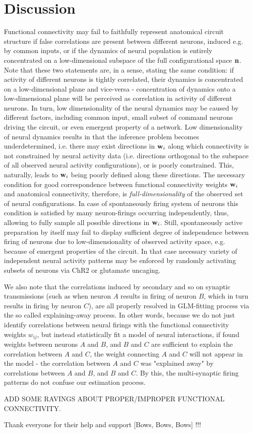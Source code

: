 \documentclass[amsmath,amssymb]{revtex4}
\begin{document}
\section{\label{discussion  }Discussion}
Functional connectivity may fail to faithfully represent anatomical circuit structure if false correlations are present between different neurons, induced e.g. by common inputs, or if the dynamics of neural population is entirely concentrated on a low-dimensional subspace of the full configurational space ${\bf n}$. Note that these two statements are, in a sense, stating the same condition: if activity of different neurons is tightly correlated, their dynamics is concentrated on a low-dimensional plane and vice-versa - concentration of dynamics onto a low-dimensional plane will be perceived as correlation in activity of different neurons. In turn, low dimensionality of the neural dynamics may be caused by different factors, including common input, small subset of command neurons driving the circuit, or even emergent property of a network. Low dimensionality of neural dynamics results in that the inference problem becomes underdetermined, i.e. there may exist directions in ${\bf w}_i$ along which connectivity is not constrained by neural activity data (i.e. directions orthogonal to the subspace of all observed neural activity configurations), or is poorly constrained. This, naturally, leads to ${\bf w}_i$ being poorly defined along these directions. The necessary condition for good correspondence between functional connectivity weights ${\bf w}_i$ and anatomical connectivity, therefore, is {\em full-dimensionality} of the observed set of neural configurations. In case of spontaneously firing system of neurons this condition is satisfied by many neuron-firings occurring independently, thus, allowing to fully sample all possible directions in ${\bf w}_i$.
Still, spontaneously active preparation by itself may fail to display sufficient degree of independence between firing of neurons due to low-dimensionality of observed activity space, e.g. because of emergent properties of the circuit. In that case necessary variety of independent neural activity patterns may be enforced by randomly activating subsets of neurons via ChR2 or glutamate uncaging.

We also note that the correlations induced by secondary and so on synaptic transmissions (such as when neuron $A$ results in firing of neuron $B$, which in turn results in firing by neuron $C$), are all properly resolved in GLM-fitting process via the so called explaining-away process. In other words, because we do not just identify correlations between neural firings with the functional connectivity weights $w_{ij}$, but instead statistically fit a model of neural interactions, if found weights between neurons $A$ and $B$, and $B$ and $C$ are sufficient to explain the correlation between $A$ and $C$, the weight connecting $A$ and $C$ will not appear in the model - the correlation between $A$ and $C$ was "explained away" by correlations between $A$ and $B$, and $B$ and $C$. By this, the multi-synaptic firing patterns do not confuse our estimation process.

ADD SOME RAVINGS ABOUT PROPER/IMPROPER FUNCTIONAL CONNECTIVITY.

\begin{acknowledgments}
Thank everyone for their help and support [Bows, Bows, Bows] !!!
\end{acknowledgments}



\end{document}
